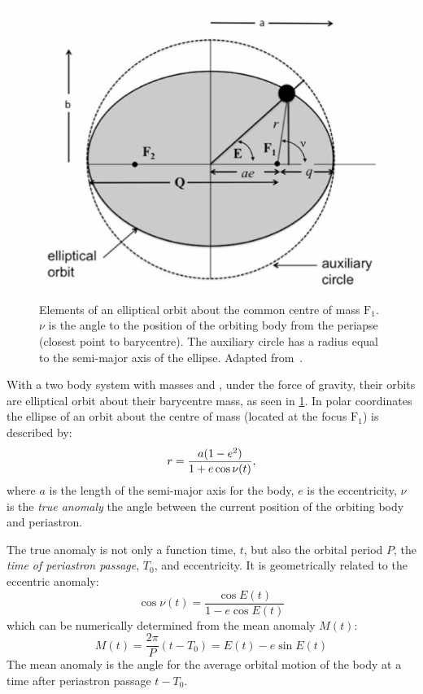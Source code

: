 \begin{figure}
    \centering
    \includegraphics[width=0.55\linewidth]{figures/fundamental_rv/eclipes_orbit2.pdf}
    \caption{Elements of an elliptical orbit about the common centre of mass \(\textrm{F}_1\). {\(\nu\)} is the angle to the position of the orbiting body from the periapse (closest point to barycentre). The auxiliary circle has a radius equal to the semi-major axis of the ellipse. Adapted from~\citep{bozza_methods_2016}.}
    \label{fig:eclipesorbit}
\end{figure}

With a two body system with masses \Mone{} and \Mtwo{}, under the force of gravity, their orbits are elliptical orbit about their barycentre mass, as seen in \cref{fig:eclipesorbit}.
In polar coordinates the ellipse of an orbit about the centre of mass (located at the focus $\textrm{F}_1$) is described by:
\begin{equation}
    r = \frac{a(1 - {e}^{2})}{1 + e \cos{\nu(t)}},
\end{equation}
where $a$ is the length of the semi-major axis for the body, $e$ is the eccentricity, $\nu$ is the \emph{true anomaly} the angle between the current position of the orbiting body and periastron.

The true anomaly is not only a function time, \(t\), but also the orbital period \(P\), the \emph{time of periastron passage}, \(T_0\), and eccentricity.
It is geometrically related to the eccentric anomaly:
\begin{equation}
    \cos{\nu(t)} = \frac{\cos{E(t)}}{1 - e \cos{E(t)}}
\end{equation}
which can be numerically determined from the mean anomaly \(M(t)\):
\begin{equation}
    M(t) = \frac{2 \pi}{P}(t - T_0) = E(t) - e \sin{E(t)}
\end{equation}
The mean anomaly is the angle for the average orbital motion of the body at a time after periastron passage \(t-T_0\).



